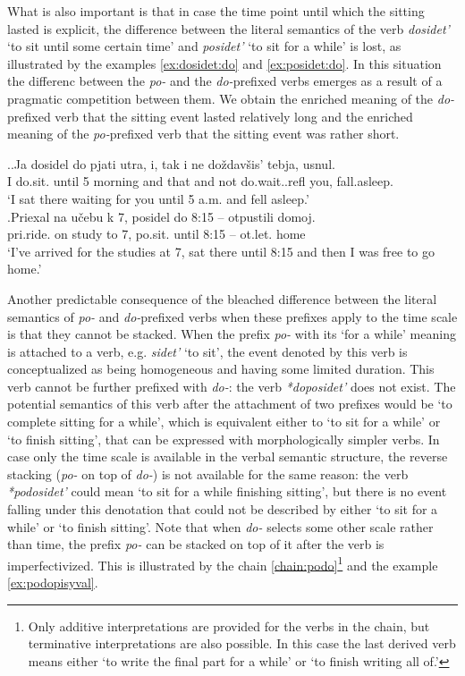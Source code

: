 What is also important is that in case the time point until which the sitting lasted is explicit, the difference between the literal semantics of the verb \textit{dosidet'} `to sit until some certain time' and \textit{posidet'} `to sit for a while' is lost, as illustrated by the examples \ref{ex:dosidet:do} and \ref{ex:posidet:do}. In this situation the differenc between the \textit{po-} and the \textit{do-}prefixed verbs emerges as a result of a pragmatic competition between them. We obtain the enriched meaning of the \textit{do-}prefixed verb that the sitting event lasted relatively long and the enriched meaning of the \textit{po-}prefixed verb that the sitting event was rather short. 

\ex.\ag.\label{ex:dosidet:do}Ja dosidel do pjati utra, i, tak i ne do\v{z}dav\v{s}is' tebja, usnul.\\
I do.sit. until 5 morning and that and not do.wait..refl you, fall.asleep.\\
\trans `I sat there waiting for you until 5 a.m. and fell asleep.'\\
\bg.\label{ex:posidet:do}Priexal na u\v{c}ebu k 7, posidel do 8:15 -- otpustili domoj.\\
pri.ride. on study to 7, po.sit. until 8:15 -- ot.let. home\\
\trans `I've arrived for the studies at 7, sat there until 8:15 and then I was free to go home.'

Another predictable consequence of the bleached difference between the literal semantics of \textit{po-} and \textit{do-}prefixed verbs when these prefixes apply to the time scale is that they cannot be stacked. When the prefix \textit{po-} with its `for a while' meaning is attached to a verb, e.g. \textit{sidet'} `to sit', the event denoted by this verb is conceptualized as being homogeneous and having some limited duration. This verb cannot be further prefixed with \textit{do-}: the verb \textit{*doposidet'} does not exist. The potential semantics of this verb after the attachment of two prefixes would be `to complete sitting for a while', which is equivalent either to `to sit for a while' or `to finish sitting', that can be expressed with morphologically simpler verbs. In case only the time scale is available in the verbal semantic structure, the reverse stacking (\textit{po-} on top of \textit{do-}) is not available for the same reason: the verb \textit{*podosidet'} could mean `to sit for a while finishing sitting', but there is no event falling under this denotation that could not be described by either `to sit for a while' or `to finish sitting'. Note that when \textit{do-} selects some other scale rather than time, the prefix \textit{po-} can be stacked on top of it after the verb is imperfectivized. This is illustrated by the chain \ref{chain:podo}\footnote{Only additive interpretations are provided for the verbs in the chain, but terminative interpretations are also possible. In this case the last derived verb means either `to write the final part for a while' or `to finish writing all of.'} and the example \ref{ex:podopisyval}.

